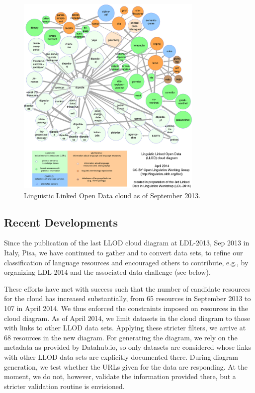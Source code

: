 \begin{figure}[t]
 \begin{center}
 \includegraphics[width=0.8\textwidth]{llod-colored.png}
 \end{center}
\caption{Linguistic Linked Open Data cloud as of September 2013.}
\label{figI18nLOD}
\end{figure}

\subsection{Recent Developments}

Since the publication of the last LLOD cloud diagram at LDL-2013, Sep 2013 in Italy, Pisa, we have continued to gather and to convert data sets, to refine our classification of language resources and encouraged others to contribute, e.g., by organizing LDL-2014 and the associated data challenge (see below).

These efforts have met with success such that the number of candidate resources for the cloud has increased substantially, from 65 resources in September 2013 to 107 in April 2014. 
We thus enforced the constraints imposed on resources in the cloud diagram. As of April 2014, we limit datasets in the cloud diagram to those with links to other LLOD data sets. 
Applying these stricter filters, we arrive at 68 resources in the new diagram.
For generating the diagram, we rely on the metadata as provided by Datahub.io, so only datasets are considered whose links with other LLOD data sets are explicitly documented there.
During diagram generation, we test whether the URLs given for the data are responding. At the moment, we do not, however, validate the information provided there, but a stricter validation routine is envisioned. 

